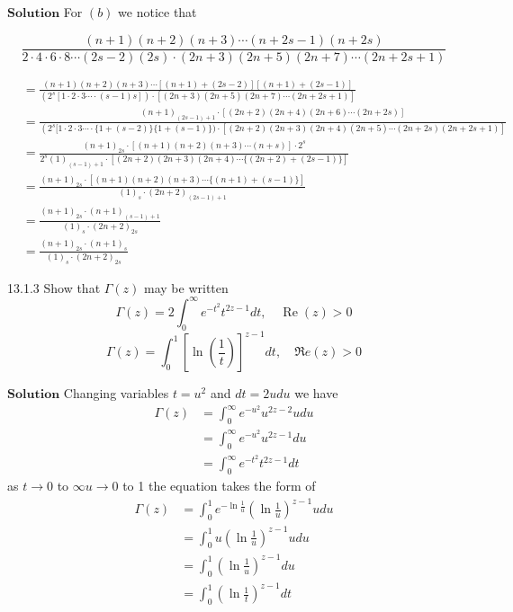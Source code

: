 $\boxed{\textbf{Solution}}$ For $(b)$ we notice that

$$
\frac{(n+1)(n+2)(n+3) \cdots(n+2 s-1)(n+2 s)}{2\cdot 4 \cdot 6 \cdot 8  \cdots (2 s-2)(2 s) \cdot(2 n+3)(2 n+5)(2 n+7) \cdots(2 n+2 s+1)}
$$

$$
\begin{aligned}
&=\frac{(n+1)(n+2)(n+3) \cdots[(n+1)+(2 s-2)][(n+1)+(2 s-1)]}{\left(2^{s}[1 \cdot 2 \cdot 3  \cdots  \cdot(s-1) s]\right) \cdot[(2 n+3)(2 n+5)(2 n+7) \cdots(2 n+2 s+1)]} \\
& =\frac{(n+1)_{(2 s-1)+1} \cdot[(2 n+2)(2 n+4)(2 n+6) \cdots(2 n+2 s)]}{\left(2^{s}[1 \cdot 2 \cdot 3  \cdots  \cdot\{1+(s-2)\}\{1+(s-1)\}) \cdot[(2 n+2)(2 n+3)(2 n+4)(2 n+5) \cdots(2 n+2 s)(2 n+2 s+1)]\right.}\\
&=\frac{(n+1)_{2 s} \cdot[(n+1)(n+2)(n+3) \cdots(n+s)] \cdot 2^{s}}{2^{s}(1)_{(s-1)+1} \cdot[(2 n+2)(2 n+3)(2 n+4) \cdots\{(2 n+2)+(2 s-1)\}]} \\
& =\frac{(n+1)_{2 s} \cdot[(n+1)(n+2)(n+3) \cdots\{(n+1)+(s-1)\}]}{(1)_{s} \cdot(2 n+2)_{(2 s-1)+1}}\\
& =\frac{(n+1)_{2 s} \cdot(n+1)_{(s-1)+1}}{(1)_{s} \cdot(2 n+2)_{2 s}}\\
&=\frac{(n+1)_{2 s} \cdot(n+1)_{s}}{(1)_{s} \cdot(2 n+2)_{2 s}}
\end{aligned}
$$


\begin{mybox}{13.1.3}
Show that $\Gamma(z)$ may be written
$$\Gamma(z)=2 \int_{0}^{\infty} e^{-t^{2}} t^{2 z-1} d t, \quad \operatorname{Re}(z)>0$$
$$\Gamma(z)=\int_{0}^{1}\left[\ln \left(\frac{1}{t}\right)\right]^{z-1} d t, \quad \Re e(z)>0$$
\end{mybox}
$\boxed{\textbf{Solution}}$ Changing variables $t=u^{2}$ and $d t=2 u d u$ we have
$$
\begin{aligned}
\Gamma (z) &=\int_{0}^{\infty} e^{-u^{2}} u^{2 z-2} u d u \\
&=\int_{0}^{\infty} e^{-u^{2}} u^{2 z-1} d u \\
&=\int_{0}^{\infty} e^{-t^{2}} t^{2 z-1} d t
\end{aligned}
$$
as $t \rightarrow 0$ to $\infty u \rightarrow 0$ to 1 the equation takes the form of 
$$
\begin{aligned}
\Gamma (z) &=\int_{0}^{1} e^{-\ln \frac{1}{u}}\left(\ln \frac{1}{u}\right)^{z-1} u d u \\
&=\int_{0}^{1} u\left(\ln \frac{1}{u}\right)^{z-1} u d u \\
&=\int_{0}^{1}\left(\ln \frac{1}{u}\right)^{z-1} d u \\
&=\int_{0}^{1}\left(\ln \frac{1}{t}\right)^{z-1} d t
\end{aligned}
$$

